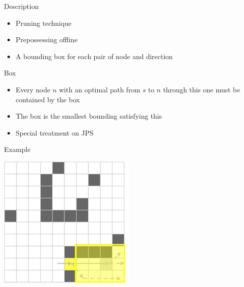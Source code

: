 \documentclass{presentation}
\begin{document}
\begin{frame}
\end{frame}



\begin{frame}{Description}
    \begin{itemize}
        \item Pruning technique
        \item Prepossessing offline
        \item A bounding box for each pair of node and direction

    \end{itemize}
\end{frame}


\begin{frame}{Box}
    \begin{itemize}
        \item Every node $n$ with an optimal path from $s$ to $n$ through this one must be contained by the box
        \item The box is the smallest bounding satisfying this
        \item Special treatment on JPS
    \end{itemize}
\end{frame}


\begin{frame}{Example}
    \begin{center}
        \includegraphics[width=0.5\textwidth]{figures/bounding_boxes1.png}
    \end{center}
\end{frame}
\end{document}
